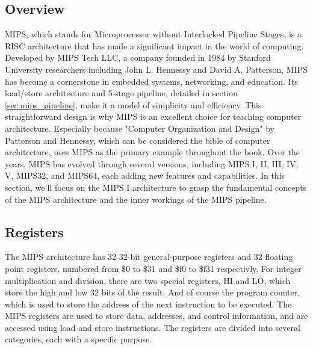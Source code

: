 \subsection{Overview}
MIPS, which stands for Microprocessor without Interlocked Pipeline Stages, is a RISC architecture that has made a significant impact in the world of computing. Developed by MIPS Tech LLC, a company founded in 1984 by Stanford University researchers including John L. Hennessy and David A. Patterson, MIPS has become a cornerstone in embedded systems, networking, and education. Its load/store architecture and 5-stage pipeline, detailed in section \ref{sec:mips_pipeline}, make it a model of simplicity and efficiency. This straightforward design is why MIPS is an excellent choice for teaching computer architecture. Especially because "Computer Organization and Design" by Patterson and Hennessy\cite{patterson1994computer}, which can be considered the bible of computer architecture, uses MIPS as the primary example throughout the book. Over the years, MIPS has evolved through several versions, including MIPS I, II, III, IV, V, MIPS32, and MIPS64, each adding new features and capabilities. In this section, we'll focus on the MIPS I architecture to grasp the fundamental concepts of the MIPS architecture and the inner workings of the MIPS pipeline.

\subsection{Registers}
The MIPS architecture has 32 32-bit general-purpose registers and 32 floating point registers, numbered from \$0 to \$31 and \$f0 to \$f31 respectivly. For integer multiplication and division, there are two special registers, HI and LO, which store the high and low 32 bits of the result. And of course the program counter, which is used to store the address of the next instruction to be executed. The MIPS registers are used to store data, addresses, and control information, and are accessed using load and store instructions. The registers are divided into several categories, each with a specific purpose.
